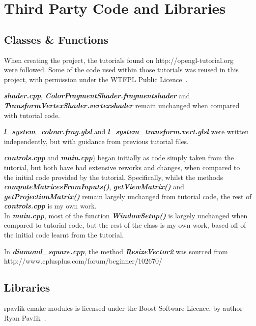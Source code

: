 \documentclass[a4paper,10pt]{report}
\begin{document}
\appendix

\chapter{Third Party Code and Libraries}

\section{Classes \& Functions}

When creating the project, the tutorials found on http://opengl-tutorial.org~\cite{opengl_tutorial} were followed. Some of the code used within those tutorials was reused in this project, with permission under the WTFPL Public Licence~\cite{wtfpl}. \medskip

\textit{\textbf{shader.cpp}}, \textit{\textbf{ColorFragmentShader.fragmentshader}} and \textit{\textbf{TransformVertexShader.vertexshader}} remain unchanged when compared with tutorial code. \medskip

\textit{\textbf{l\_system\_colour.frag.glsl}} and \textit{\textbf{l\_system\_transform.vert.glsl}} were written independently, but with guidance from previous tutorial files.\medskip

\textit{\textbf{controls.cpp}} and \textit{\textbf{main.cpp}}) began initially as code simply taken from the tutorial, but both have had extensive reworks and changes, when compared to the initial code provided by the tutorial. Specifically, whilst the methods \textit{\textbf{computeMatricesFromInputs()}}, \textit{\textbf{getViewMatrix()}} and \textit{\textbf{getProjectionMatrix()}} remain largely unchanged from tutorial code, the rest of \textit{\textbf{controls.cpp}} is my own work. \\

In \textit{\textbf{main.cpp}}, most of the function \textit{\textbf{WindowSetup()}} is largely unchanged when compared to tutorial code, but the rest of the class is my own work, based off of the initial code learnt from the tutorial. \medskip

In \textit{\textbf{diamond\_square.cpp}}, the method \textit{\textbf{ResizeVector2}} was sourced from http://www.cplusplus.com/forum/beginner/102670/ 

\section{Libraries}

rpavlik-cmake-modules is licensed under the Boost Software Licence, by author Ryan Pavlik~\cite{boostSoftwareLicence}. \medskip
\end{document}

